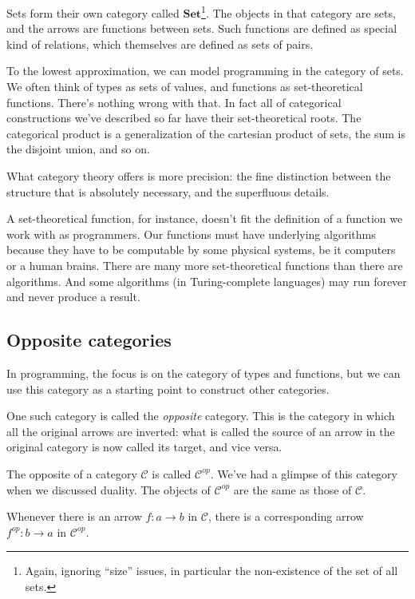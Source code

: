 \documentclass[DaoFP]{subfiles}
\begin{document}
Sets form their own category called $\mathbf{Set}$\footnote{Again, ignoring ``size'' issues, in particular the non-existence of the set of all sets.}. The objects in that category are sets, and the arrows are functions between sets. Such functions are defined as special kind of relations, which themselves are defined as sets of pairs.

To the lowest approximation, we can model programming in the category of sets. We often think of types as sets of values, and functions as set-theoretical functions. There's nothing wrong with that. In fact all of categorical constructions we've described so far have their set-theoretical roots. The categorical product is a generalization of the cartesian product of sets, the sum is the disjoint union, and so on. 

What category theory offers is more precision: the fine distinction between the structure that is absolutely necessary, and the superfluous details. 

A set-theoretical function, for instance, doesn't fit the definition of a function we work with as programmers. Our functions must have underlying algorithms because they have to be computable by some physical systems, be it computers or a human brains. There are many more set-theoretical functions than there are algorithms. And some algorithms (in Turing-complete languages) may run forever and never produce a result. 

\subsection{Opposite categories}
In programming, the focus is on the category of types and functions, but we can use this category as a starting point to construct other categories. 
 
One such category is called the \emph{opposite} category. This is the category in which all the original arrows are inverted: what is called the source of an arrow in the original category is now called its target, and vice versa. 

The opposite of a category $\mathcal{C}$ is called $\mathcal{C}^{op}$. We've had a glimpse of this category when we discussed duality. The objects of $\mathcal{C}^{op}$ are the same as those of $\mathcal{C}$. 

Whenever there is an arrow $f \colon a \to b$ in $\mathcal{C}$, there is a corresponding arrow $f^{op} \colon b \to a$ in $\mathcal{C}^{op}$. 
\end{document}
